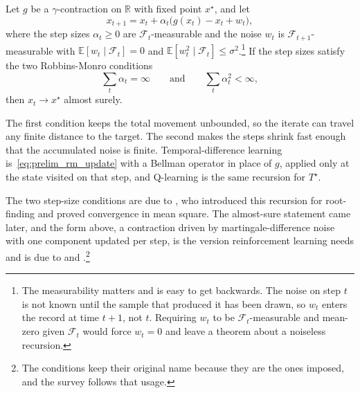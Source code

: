 \begin{theorem}
\label{thm:prelim_robbins_monro}
Let $g$ be a $\gamma$-contraction on $\mathbb{R}$ with fixed point $x^\star$, and let
\begin{equation}
x_{t+1} = x_t + \alpha_t\bigl(g(x_t) - x_t + w_t\bigr),
\label{eq:prelim_rm_update}
\end{equation}
where the step sizes $\alpha_t \geq 0$ are $\mathcal{F}_t$-measurable and the noise $w_t$ is $\mathcal{F}_{t+1}$-measurable with $\mathbb{E}[w_t \mid \mathcal{F}_t] = 0$ and $\mathbb{E}[w_t^2 \mid \mathcal{F}_t] \leq \sigma^2$.\footnote{The measurability matters and is easy to get backwards. The noise on step $t$ is not known until the sample that produced it has been drawn, so $w_t$ enters the record at time $t+1$, not $t$. Requiring $w_t$ to be $\mathcal{F}_t$-measurable and mean-zero given $\mathcal{F}_t$ would force $w_t = 0$ and leave a theorem about a noiseless recursion.} If the step sizes satisfy the two Robbins-Monro conditions
\begin{equation}
\sum_{t} \alpha_t = \infty \qquad \text{and} \qquad \sum_{t} \alpha_t^2 < \infty,
\label{eq:prelim_rm_conditions}
\end{equation}
then $x_t \to x^\star$ almost surely.
\end{theorem}

The first condition keeps the total movement unbounded, so the iterate can travel any finite distance to the target. The second makes the steps shrink fast enough that the accumulated noise is finite. Temporal-difference learning is~\eqref{eq:prelim_rm_update} with a Bellman operator in place of $g$, applied only at the state visited on that step, and Q-learning is the same recursion for $T^\star$.

The two step-size conditions are due to \citet{robbinsmonro1951}, who introduced this recursion for root-finding and proved convergence in mean square. The almost-sure statement came later, and the form above, a contraction driven by martingale-difference noise with one component updated per step, is the version reinforcement learning needs and is due to \citet{jaakkola1994} and \citet{tsitsiklis1994}.\footnote{The conditions keep their original name because they are the ones \citet{robbinsmonro1951} imposed, and the survey follows that usage.}

